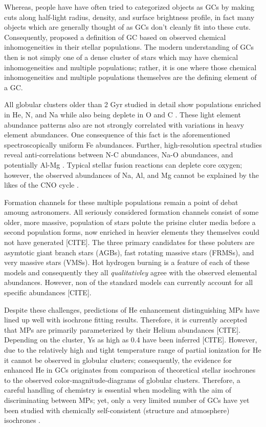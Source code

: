Whereas, people have have often tried to categorized objects as GCs by making
cuts along half-light radius, density, and surface brightness profile, in fact
many objects which are generally thought of as GCs don't cleanly fit into these
cuts. Consequently, \citet{Carretta2010} proposed a definition of GC based on
observed chemical inhomogeneities in their stellar populations. The modern
understanding of GCs then is not simply one of a dense cluster of stars which
may have chemical inhomogeneities and multiple populations; rather, it is one
where those chemical inhomogeneities and multiple populations themselves are
the defining element of a GC.

All globular clusters older than 2 Gyr studied in detail show populations
enriched in He, N, and Na while also being deplete in O and C
\citep{Piotto2015,Bastian2018}. These light element abundance patterns also are
not strongly correlated with variations in heavy element abundances. One
consequence of this fact is the aforementioned spectroscopically uniform Fe
abundances. Further, high-resolution spectral studies reveal anti-correlations
between N-C abundances, Na-O abundances, and potentially Al-Mg
\citep{Sneden1992, Gratton2012}. Typical stellar fusion reactions can deplete
core oxygen; however, the observed abundances of Na, Al, and Mg cannot be
explained by the likes of the CNO cycle \citep{Prantzos2007}.

Formation channels for these multiple populations remain a point of debat
amoung astronomers. All seriously considered formation channels consist of some
older, more massive, population of stars polute the prisine cluter media before
a second population forms, now enriched in heavier elements they themselves
could not have generated [CITE]. The three primary candidates for these
poluters are asymtotic giant branch stars (AGBs), fast rotating massive stars
(FRMSs), and very massive stars (VMSs). Hot hydrogen burning is a feature of
each of these models and consequently they all {\it qualitativley} agree with
the observed elemental abundances. However, non of the standard models can
currently account for all specific abundances [CITE].

Despite these challenges, predictions of He enhancement distinguishing MPs have
lined up well with isochrone fitting results. Therefore, it is currently
accepted that MPs are primarily parameterized by their Helium abundances
[CITE]. Depending on the cluster, Ys as high as 0.4 have been inferred [CITE].
However, due to the relatively high and tight temperature range of partial
ionization for He it cannot be observed in globular clusters; consequently, the
evidence for enhanced He in GCs originates from comparison of theoretical
stellar isochrones to the observed color-magnitude-diagrams of globular
clusters. Therefore, a careful handling of chemistry is essential when modeling
with the aim of discriminating between MPs; yet, only a very limited number of
GCs have yet been studied with chemically self-consistent (structure and
atmosphere) isochrones \citep[e.g.][NGC 6752]{Dotter2015}.

